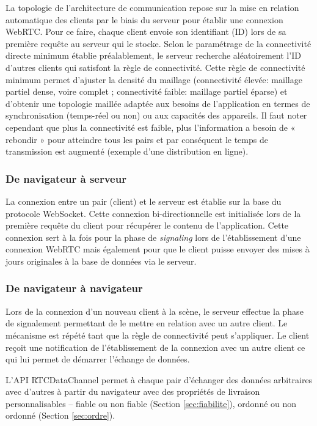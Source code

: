 La topologie de l'architecture de communication repose sur la mise en relation 
automatique des clients par le biais du serveur pour établir une connexion 
\gls{WebRTC}. Pour ce faire, chaque client envoie son identifiant (ID) lors de sa 
première requête au serveur qui le stocke. Selon le paramétrage de la connectivité 
directe minimum établie préalablement, le serveur recherche aléatoirement l'ID 
d'autres clients qui satisfont la règle de connectivité. Cette règle de connectivité 
minimum permet d'ajuster la densité du maillage (connectivité élevée: maillage 
partiel dense, voire complet ; connectivité faible: maillage partiel éparse) et 
d'obtenir une topologie maillée adaptée aux besoins de l'application en termes de 
synchronisation (temps-réel ou non) ou aux capacités des appareils. Il faut noter 
cependant que plus la connectivité est faible, plus l'information a besoin de « 
rebondir » pour atteindre tous les pairs et par conséquent le temps de 
transmission est augmenté (exemple d'une distribution en ligne). 

\subsubsection{De navigateur à serveur}
La connexion entre un pair (client) et le serveur est établie sur la base du protocole 
\gls{WebSocket}. Cette connexion bi-directionnelle est initialisée lors de la 
première requête du client pour récupérer le contenu de l'application. Cette 
connexion sert à la fois pour la phase de \textit{signaling} lors de l'établissement 
d'une connexion WebRTC mais également pour que le client puisse envoyer des 
mises à jours originales à la base de données via le serveur.

\subsubsection{De navigateur à navigateur}
Lors de la connexion d'un nouveau client à la scène, le serveur effectue la phase 
de signalement permettant de le mettre en relation avec un autre client. Le 
mécanisme est répété tant que la règle de connectivité peut s'appliquer. Le client 
reçoit une notification de l'établissement de la connexion avec un autre client ce 
qui lui permet de démarrer l'échange de données.

L'API RTCDataChannel permet à chaque pair d'échanger des données arbitraires 
avec d'autres à partir du navigateur avec des propriétés de livraison 
personnalisables -- fiable ou non fiable (Section \ref{sec:fiabilite}), ordonné ou non 
ordonné (Section \ref{sec:ordre}). 

